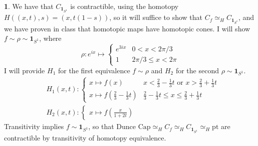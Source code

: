 \documentclass[10.5pt]{article}
\theoremstyle{definition}
\newtheorem{pb}{}
\newcommand{\tor}{\text{ or }}
\newcommand{\ism}{\simeq}
\begin{document}
\begin{pb}
        We have that \(C_{\mathbf{1}_{S^1}}\) is contractible, using the homotopy \(H((x,t),s) = (x,t(1-s))\), so it will suffice to show that \(C_{f} \ism_H C_{\mathbf{1}_{S^1}}\), and we 
        have proven in class that homotopic maps have homotopic cones. I will show \(f \sim \rho \sim \mathbf{1}_{S^1}\), where \[\rho: e^{ix} \mapsto 
        \begin{cases} 
        e^{3ix} & 0 < x < 2\pi/3 \\ 
        1 & 2\pi/3 \leq x < 2\pi
        \end{cases}\]
        I will provide \(H_1\) for the first equivalence \(f \sim \rho\) and \(H_2\) for the second \(\rho \sim \mathbf{1}_{S^1}\).
        \begin{align*}
            &H_1(x,t):
            \begin{cases}
                x \mapsto f(x) & x < \frac{2}{3} - \frac{1}{3}t \tor x > \frac{2}{3} + \frac{1}{3}t \\ 
                x \mapsto f(\frac{2}{3} - \frac{1}{3}t) & \frac{2}{3} - \frac{1}{3}t \leq x \leq \frac{2}{3} + \frac{1}{3}t
            \end{cases} \\
            &H_2(x,t):
            \begin{cases}
                x \mapsto f(\frac{x}{1 + 2t})
            \end{cases}
        \end{align*}
        Transitivity implies \(f \sim \mathbf{1}_{S^1}\), so that \(\text{Dunce Cap} \ism_H C_f \ism_H C_{\mathbf{1}_{S^1}} \ism_H \text{pt}\) are contractible by transitivity of homotopy equivalence.
    \end{pb}
\end{document}
